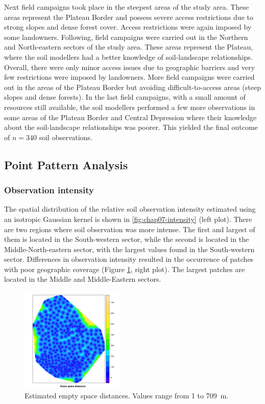 Next field campaigns took place in the steepest areas of the study area. These areas represent the Plateau 
Border and possess severe access restrictions due to strong slopes and dense forest cover. Access restrictions 
were again imposed by some landowners. Following, field campaigns were carried out in the Northern and 
North-eastern sectors of the study area. These areas represent the Plateau, where the soil modellers had a 
better knowledge of soil-landscape relationships. Overall, there were only minor access issues due to 
geographic barriers and very few restrictions were imposed by landowners. More field campaigns were carried 
out in the areas of the Plateau Border but avoiding difficult-to-access areas (steep slopes and dense forests).
In the last field campaigns, with a small amount of resources still available, the soil modellers performed a 
few more observations in some areas of the Plateau Border and Central Depression where their knowledge about 
the 
soil-landscape relationships was poorer. This yielded the final outcome of $n = 340$ soil observations.

\subsection{Point Pattern Analysis}

\subsubsection{Observation intensity}

The spatial distribution of the relative soil observation intensity estimated using an isotropic Gaussian 
kernel is shown in \autoref{fig:chap07-intensity} (left plot). There are two regions where soil observation 
was 
more intense. The first and largest of them is located in the South-western sector, while the second is 
located in the Middle-North-eastern sector, with the largest values found in the South-western sector. 
Differences in observation intensity resulted in the occurrence of patches with poor 
geographic coverage (Figure \ref{fig:chap07-intensity}, right plot). The largest patches are 
located in the Middle and Middle-Eastern sectors.

\begin{figure}[!ht]
 \centering
 \includegraphics[width=5cm]{fig/chap07-empty-space}

 \caption{Estimated empty space distances. Values range from \num{1} to \SI{709}{\m}.}
\label{fig:chap07-intensity}
\end{figure}

